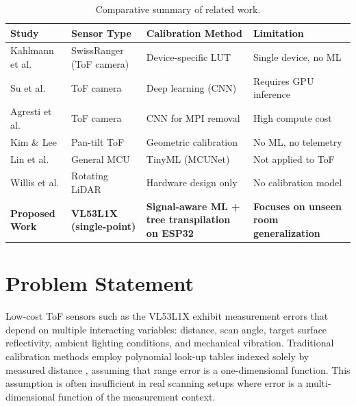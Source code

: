 \documentclass[12pt,a4paper]{article}
\begin{document}
    \begin{table}[H]
    \centering
    \caption{Comparative summary of related work.}
    \label{tab:lit_comparison}
    \small
    \begin{tabularx}{\textwidth}{|p{1.1in}|p{1.0in}|X|p{1.1in}|}
    \hline
    \textbf{Study} & \textbf{Sensor Type} & \textbf{Calibration Method} & \textbf{Limitation} \\
    \hline
    Kahlmann et al. \cite{kahlmann2006calibration} & SwissRanger (ToF camera) & Device-specific LUT & Single device, no ML \\
    \hline
    Su et al. \cite{su2018deeptof} & ToF camera & Deep learning (CNN) & Requires GPU inference \\
    \hline
    Agresti et al. \cite{agresti2018deep} & ToF camera & CNN for MPI removal & High compute cost \\
    \hline
    Kim \& Lee \cite{kim2015design} & Pan-tilt ToF & Geometric calibration & No ML, no telemetry \\
    \hline
    Lin et al. \cite{lin2020mcunet} & General MCU & TinyML (MCUNet) & Not applied to ToF \\
    \hline
    Willis et al. \cite{willis2009design} & Rotating LiDAR & Hardware design only & No calibration model \\
    \hline
    \textbf{Proposed Work} & \textbf{VL53L1X (single-point)} & \textbf{Signal-aware ML + tree transpilation on ESP32} & \textbf{Focuses on unseen room generalization} \\
    \hline
    \end{tabularx}
    \end{table}



    \section{Problem Statement}

    Low-cost ToF sensors such as the VL53L1X exhibit measurement errors that depend on multiple interacting variables: distance, scan angle, target surface reflectivity, ambient lighting conditions, and mechanical vibration. Traditional calibration methods employ polynomial look-up tables indexed solely by measured distance \cite{lindner2010time, kahlmann2006calibration}, assuming that range error is a one-dimensional function. This assumption is often insufficient in real scanning setups where error is a multi-dimensional function of the measurement context.
\end{document}
